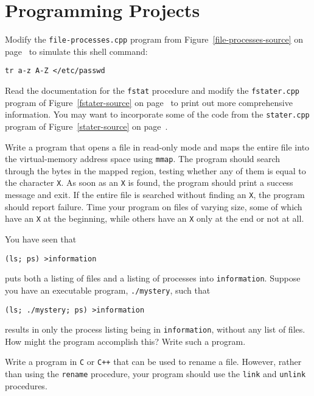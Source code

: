 \section*{Programming Projects}
\begin{chapterEnumerate}
\item Modify the {\tt file-processes.cpp} program from Figure~\ref{file-processes-source} on page~\pageref{file-processes-source} to
simulate this shell command:
\begin{verbatim}
tr a-z A-Z </etc/passwd
\end{verbatim}
\item
Read the documentation for the \verb|fstat| procedure and modify the
\verb|fstater.cpp| program of Figure~\ref{fstater-source} on
page~\pageref{fstater-source} to print out more comprehensive
information.   You may want to incorporate some of the code from the
\verb|stater.cpp| program of Figure~\ref{stater-source} on
page~\pageref{stater-source}.
\item
Write a program that opens a file in read-only mode and maps the
entire file into
the virtual-memory address space using \verb|mmap|.  The program should search
through the bytes in the mapped region, testing whether any of them is
equal to the character \verb|X|.  As soon as an \verb|X| is found,
the program should print a success message and exit.  If the entire file is searched
without finding an \verb|X|, the program should report failure.  Time your program on
files of varying size, some of which have an \verb|X| at the
beginning, while others have an \verb|X| only at the end or not at
all.
\item
You have seen that
\begin{verbatim}
(ls; ps) >information
\end{verbatim}
puts both a listing of files and a listing of processes into
\verb|information|.  Suppose you have an executable program,
\verb|./mystery|, such that
\begin{verbatim}
(ls; ./mystery; ps) >information
\end{verbatim}
results in only the process listing being in \verb|information|,
without any list of files.  How might the program accomplish this?
Write such a program.
\item
Write a program in \verb|C| or \verb|C++| that can be used to rename a
file.  However, rather than using the \verb|rename| procedure, your
program should use the \verb|link| and \verb|unlink| procedures.
\end{chapterEnumerate}


